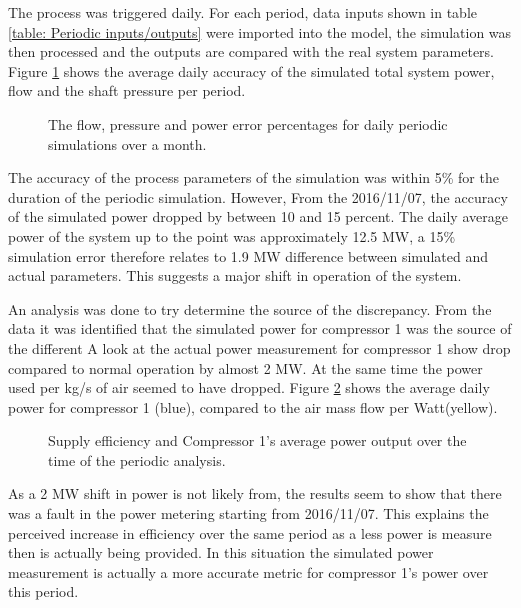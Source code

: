  The process was triggered daily. For each period, data inputs shown in table \ref{table: Periodic inputs/outputs} were imported into the model, the simulation was then processed and the outputs are compared with the real system parameters. Figure \ref{fig: Periodic simulation} shows the average daily accuracy of the simulated total system power, flow and the shaft pressure per period.
	     \par 
     
	\begin{figure}[h]
		\centering
		
		\caption{The flow, pressure and power error percentages for daily periodic simulations over a month.}
		\label{fig: Periodic simulation}
	\end{figure}   
The accuracy of the process parameters of the simulation was within 5\% for the duration of the periodic simulation. However, From the 2016/11/07, the accuracy of the simulated power dropped by between 10 and 15 percent. The daily average power of the system up to the point was approximately 12.5 MW, a 15\% simulation error therefore relates to 1.9 MW difference between simulated and actual parameters. This suggests a major shift in operation of the system.
\par 
An analysis was done to try determine the source of the discrepancy. From the data it was identified that the simulated power for compressor 1 was the source of the different A look at the actual power measurement for compressor 1 show drop compared to normal operation by almost 2 MW. At the same time the power used per kg/s of air seemed to have dropped. Figure \ref{fig: MeasurementAccuracy.} shows the average daily power for compressor 1 (blue), compared to the air mass flow per Watt(yellow). 
	\begin{figure}[h]
		\centering
		
		\caption{Supply efficiency and Compressor 1's average power output over the time of the periodic analysis.}
		\label{fig: MeasurementAccuracy.}
	\end{figure} 
As a 2 MW shift in power is not likely from, the results seem to show that there was a fault in the power metering starting from 2016/11/07. This explains the perceived increase in efficiency over the same period as a less power is measure then is actually being provided. In this situation the simulated power measurement is actually a more accurate metric for compressor 1's power over this period.  
